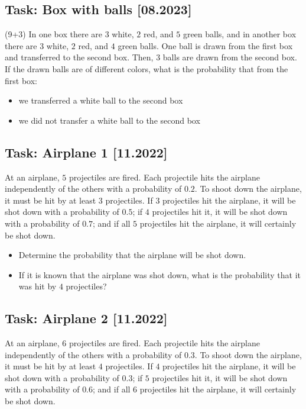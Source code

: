 \documentclass[a4paper, 12pt]{article}
\begin{document}
\subsection*{Task: Box with balls [08.2023]}

(9+3) In one box there are $3$ white, $2$ red, and $5$ green balls, and in another box there are $3$ white, $2$ red, and $4$ green balls. One ball is drawn from the first box and transferred to the second box. Then, $3$ balls are drawn from the second box. If the drawn balls are of different colors, what is the probability that from the first box:

\begin{itemize}
    \item [a)] we transferred a white ball to the second box
    \item [b)] we did not transfer a white ball to the second box
\end{itemize}


\subsection*{Task: Airplane 1 [11.2022]}
At an airplane, $5$ projectiles are fired. Each projectile hits the airplane independently of the others with a probability of $0.2$. To shoot down the airplane, it must be hit by at least $3$ projectiles. If $3$ projectiles hit the airplane, it will be shot down with a probability of $0.5$; if $4$ projectiles hit it, it will be shot down with a probability of $0.7$; and if all $5$ projectiles hit the airplane, it will certainly be shot down.

\begin{itemize}
    \item [a)] Determine the probability that the airplane will be shot down.
    \item [b)] If it is known that the airplane was shot down, what is the probability that it was hit by $4$ projectiles?
\end{itemize}

\subsection*{Task: Airplane 2 [11.2022]}

At an airplane, $6$ projectiles are fired. Each projectile hits the airplane independently of the others with a probability of $0.3$. To shoot down the airplane, it must be hit by at least $4$ projectiles. If $4$ projectiles hit the airplane, it will be shot down with a probability of $0.3$; if $5$ projectiles hit it, it will be shot down with a probability of $0.6$; and if all $6$ projectiles hit the airplane, it will certainly be shot down.
\end{document}
